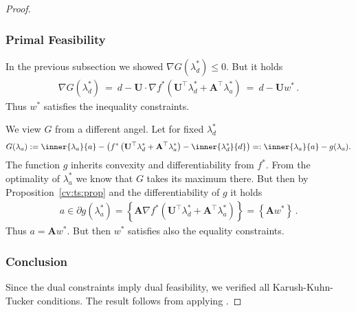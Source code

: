 \begin{proof}
\subsubsection*{Primal Feasibility}
In the previous subsection we showed
$
  \nabla G(\lambda_d^*)\le 0
$.
But it holds
\begin{gather}
  \nabla G(\lambda_d^*)
  \ 
  =
  \ 
  d
  -
  \mathbf{U}
  \cdot
  \nabla
    f^*
    \left( 
      \mathbf{U}^\top  \lambda_d^*
      +
      \mathbf{A}^\top  \lambda_a^*
    \right)
    \ 
  =
  \ 
  d
  -
  \mathbf{U}w^*
  \,.
\end{gather}
Thus
$w^*$ satisfies the inequality constraints. 

We view $G$ from a different angel. Let for fixed
$\lambda^*_d$
\begin{gather}
  G(\lambda_a)
  :=
  \inner
  {\lambda_a}{a}
  -
  \left( 
    f^*
    \left( 
      \mathbf{U}^\top  \lambda_d^*
      +
      \mathbf{A}^\top  \lambda_a^*
    \right)
    -
  \inner
  {\lambda_d^*}{d}
  \right)
  =:
  \inner
  {\lambda_a}{a}
  -
  g(\lambda_a)
  .
\end{gather}
The function $g$ inherits convexity and differentiability from 
$f^*$.
From the optimality of $\lambda_a^*$ we know that
$G$ takes its maximum there. But then by Proposition~\ref{cv:ts:prop}
and the differentiability of $g$ it holds
\begin{gather}
  a
  \in
  \partial
  g(\lambda_a^*)
  =
  \left\{ 
    \mathbf{A}
    \nabla
    f^*
    \left( 
      \mathbf{U}^\top  \lambda_d^*
      +
      \mathbf{A}^\top  \lambda_a^*
    \right)
  \right\}
  =
  \left\{ 
    \mathbf{A}
    w^*
  \right\}
  \,.
\end{gather}
Thus $a=
    \mathbf{A}
    w^*
$. But then $w^*$ satisfies also the equality constraints.
\subsubsection*{Conclusion}
Since the dual constraints imply dual feasibility, we verified 
all Karush-Kuhn-Tucker conditions. The result follows from applying 
\cite[Theorem~28.3]{Rockafellar1970}.
\end{proof}
